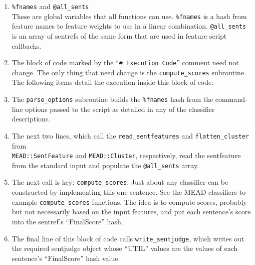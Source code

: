 \documentclass[10pt]{article}
\begin{document}
\begin{enumerate}
\item \verb|%fnames| and \verb|@all_sents|\\
  These are global variables that all functions can use.
  \verb|%fnames| is a hash from feature names to feature weights
  to use in a linear combination.  \verb|@all_sents| is
  an array of sentrefs of the same form that are used 
  in feature script callbacks.
\item The block of code marked by the ``\verb|# Execution Code|''
  comment need not change.  The only thing that need change
  is the \verb|compute_scores| subroutine.  The following items
  detail the execution inside this block of code.
\item The \verb|parse_options| subroutine builds the \verb|%fnames|
  hash from the command-line options passed to the script
  as detailed in any of the classifier descriptions.
\item The next two lines, which call the \verb|read_sentfeatures|
  and \verb|flatten_cluster| from \\
  \verb|MEAD::SentFeature| and \verb|MEAD::Cluster|,
  respectively, read the sentfeature from the standard input
  and populate the \verb|@all_sents| array.
\item The next call is key: \verb|compute_scores|.  Just about any
  classifier can be constructed by implementing this one
  sentence.  See the MEAD classifiers to example \verb|compute_scores|
  functions.  The idea is to compute scores, probably but
  not necessarily based on the input features, and put each
  sentence's score into the sentref's ``FinalScore'' hash.
\item The final line of this block of code calls
  \verb|write_sentjudge|, which writes out the required sentjudge
  object whose ``UTIL'' values are the values of each sentence's
  ``FinalScore'' hash value.
\end{enumerate}
\end{document}
